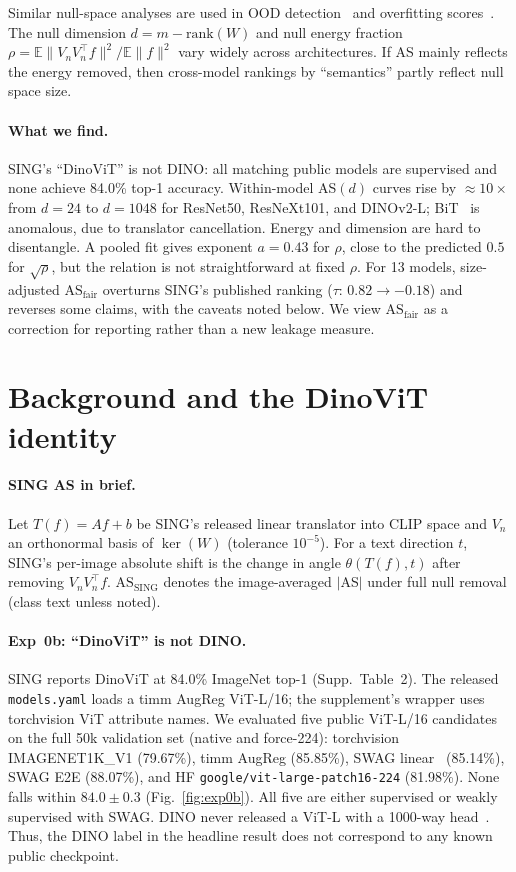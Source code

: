 \documentclass[10pt,twocolumn]{article}
\begin{document}
Similar null-space analyses are used in OOD detection~\citep{vim2022,cook2020} and overfitting scores~\citep{rezaei2023}.
The null dimension $d{=}m{-}\mathrm{rank}(W)$ and null energy fraction $\rho = \mathbb{E}\|V_nV_n^\top f\|^2/\mathbb{E}\|f\|^2$ vary widely across architectures.
If AS mainly reflects the energy removed, then cross-model rankings by ``semantics'' partly reflect null space size.

\paragraph{What we find.}
SING's ``DinoViT'' is not DINO: all matching public models are supervised and none achieve 84.0\% top-1 accuracy.
Within-model AS$(d)$ curves rise by $\approx\!10\times$ from $d{=}24$ to $d{=}1048$ for ResNet50, ResNeXt101, and DINOv2-L; BiT~\citep{bit2020} is anomalous, due to translator cancellation.
Energy and dimension are hard to disentangle. A pooled fit gives exponent $a{=}0.43$ for $\rho$, close to the predicted $0.5$ for $\sqrt{\rho}$, but the relation is not straightforward at fixed $\rho$.
For 13 models, size-adjusted $\mathrm{AS}_{\mathrm{fair}}$ overturns SING's published ranking ($\tau{:}\,0.82\to{-}0.18$) and reverses some claims, with the caveats noted below.
We view $\mathrm{AS}_{\mathrm{fair}}$ as a correction for reporting rather than a new leakage measure.

\section{Background and the DinoViT identity}
\vspace{-0.2em}
\paragraph{SING AS in brief.}
Let $T(f)=Af+b$ be SING's released linear translator into CLIP space and $V_n$ an orthonormal basis of $\ker(W)$ (tolerance $10^{-5}$).  
For a text direction $t$, SING's per-image absolute shift is the change in angle $\theta(T(f),t)$ after removing $V_nV_n^\top f$.  
$\mathrm{AS}_{\mathrm{SING}}$ denotes the image-averaged $|$AS$|$ under full null removal (class text unless noted).

\paragraph{Exp~0b: ``DinoViT'' is not DINO.}
SING reports DinoViT at 84.0\% ImageNet top-1 (Supp.\ Table~2).  
The released \texttt{models.yaml} loads a timm AugReg ViT-L/16; the supplement's wrapper uses torchvision ViT attribute names.  
We evaluated five public ViT-L/16 candidates on the full 50k validation set (native and force-224):  
torchvision IMAGENET1K\_V1 (79.67\%),  
timm AugReg (85.85\%),  
SWAG linear~\citep{swag2022} (85.14\%),  
SWAG E2E (88.07\%),  
and HF \texttt{google/vit-large-patch16-224} (81.98\%).  
None falls within $84.0\pm0.3$ (Fig.~\ref{fig:exp0b}).  
All five are either supervised or weakly supervised with SWAG. DINO never released a ViT-L with a 1000-way head~\citep{dino2021}.  
Thus, the DINO label in the headline result does not correspond to any known public checkpoint.
\end{document}
